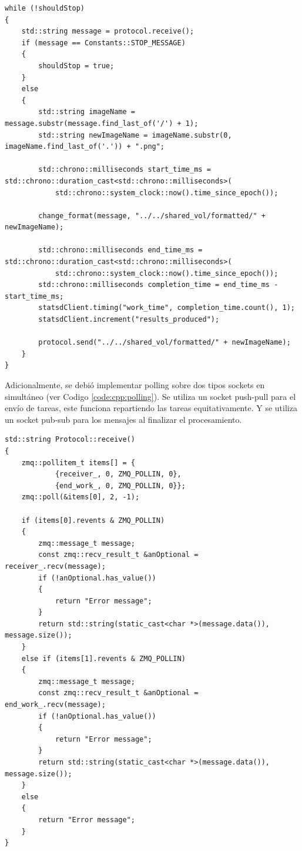 \documentclass[11pt]{article}
\begin{document}
\begin{listing}[ht]
\begin{verbatim}
while (!shouldStop)
{
    std::string message = protocol.receive();
    if (message == Constants::STOP_MESSAGE)
    {
        shouldStop = true;
    }
    else
    {
        std::string imageName = message.substr(message.find_last_of('/') + 1);
        std::string newImageName = imageName.substr(0, imageName.find_last_of('.')) + ".png";

        std::chrono::milliseconds start_time_ms = std::chrono::duration_cast<std::chrono::milliseconds>(
            std::chrono::system_clock::now().time_since_epoch());

        change_format(message, "../../shared_vol/formatted/" + newImageName);

        std::chrono::milliseconds end_time_ms = std::chrono::duration_cast<std::chrono::milliseconds>(
            std::chrono::system_clock::now().time_since_epoch());
        std::chrono::milliseconds completion_time = end_time_ms - start_time_ms;
        statsdClient.timing("work_time", completion_time.count(), 1);
        statsdClient.increment("results_produced");

        protocol.send("../../shared_vol/formatted/" + newImageName);
    }
}
\end{verbatim}
\caption{Extracto de la función principal de un \textit{format worker} en C++}
\label{code:cpp:format_worker}
\end{listing}

Adicionalmente, se debió implementar polling sobre dos tipos sockets en simultáneo (ver Codigo \ref{code:cpp:polling}). Se utiliza un socket push-pull para el envío de tareas, este funciona repartiendo las tareas equitativamente. Y se utiliza un socket pub-sub para los mensajes al finalizar el procesamiento.

\begin{listing}[ht]
\begin{verbatim}
std::string Protocol::receive()
{
    zmq::pollitem_t items[] = {
            {receiver_, 0, ZMQ_POLLIN, 0},
            {end_work_, 0, ZMQ_POLLIN, 0}};
    zmq::poll(&items[0], 2, -1);

    if (items[0].revents & ZMQ_POLLIN)
    {
        zmq::message_t message;
        const zmq::recv_result_t &anOptional = receiver_.recv(message);
        if (!anOptional.has_value())
        {
            return "Error message";
        }
        return std::string(static_cast<char *>(message.data()), message.size());
    }
    else if (items[1].revents & ZMQ_POLLIN)
    {
        zmq::message_t message;
        const zmq::recv_result_t &anOptional = end_work_.recv(message);
        if (!anOptional.has_value())
        {
            return "Error message";
        }
        return std::string(static_cast<char *>(message.data()), message.size());
    }
    else
    {
        return "Error message";
    }
}
\end{verbatim}
\caption{Extracto de la función principal de un \textit{format worker} en C++}
\label{code:cpp:polling}
\end{listing}
\end{document}
